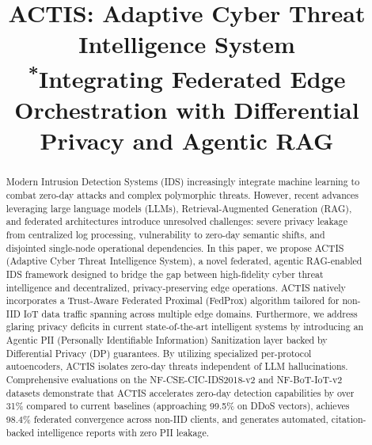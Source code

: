 \documentclass[conference]{IEEEtran}
\begin{document}
\title{ACTIS: Adaptive Cyber Threat Intelligence System\\
{\footnotesize \textsuperscript{*}Integrating Federated Edge Orchestration with Differential Privacy and Agentic RAG}
}

\author{
\and
{}
}

\maketitle

\begin{abstract}
Modern Intrusion Detection Systems (IDS) increasingly integrate machine learning to combat zero-day attacks and complex polymorphic threats. However, recent advances leveraging large language models (LLMs), Retrieval-Augmented Generation (RAG), and federated architectures introduce unresolved challenges: severe privacy leakage from centralized log processing, vulnerability to zero-day semantic shifts, and disjointed single-node operational dependencies. In this paper, we propose ACTIS (Adaptive Cyber Threat Intelligence System), a novel federated, agentic RAG-enabled IDS framework designed to bridge the gap between high-fidelity cyber threat intelligence and decentralized, privacy-preserving edge operations. ACTIS natively incorporates a Trust-Aware Federated Proximal (FedProx) algorithm tailored for non-IID IoT data traffic spanning across multiple edge domains. Furthermore, we address glaring privacy deficits in current state-of-the-art intelligent systems by introducing an Agentic PII (Personally Identifiable Information) Sanitization layer backed by Differential Privacy (DP) guarantees. By utilizing specialized per-protocol autoencoders, ACTIS isolates zero-day threats independent of LLM hallucinations. Comprehensive evaluations on the NF-CSE-CIC-IDS2018-v2 and NF-BoT-IoT-v2 datasets demonstrate that ACTIS accelerates zero-day detection capabilities by over 31\% compared to current baselines (approaching 99.5\% on DDoS vectors), achieves 98.4\% federated convergence across non-IID clients, and generates automated, citation-backed intelligence reports with zero PII leakage.
\end{abstract}
\end{document}
